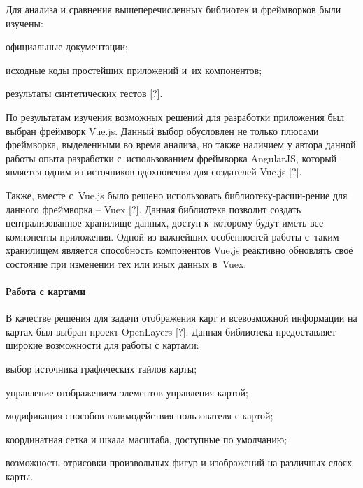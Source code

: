 Для анализа и сравнения вышеперечисленных библиотек и фреймворков были изучены:
\begin{dashitemize}
  \item официальные документации;
  \item исходные коды простейших приложений и~их компонентов;
  \item результаты синтетических тестов [?].
\end{dashitemize}

По результатам изучения возможных решений для разработки приложения был выбран фреймворк Vue.js. Данный выбор обусловлен не только плюсами фреймворка, выделенными во время анализа, но также наличием у автора данной работы опыта разработки с~использованием фреймворка AngularJS, который является одним из источников вдохновения для создателей Vue.js [?].

Также, вместе с~Vue.js было решено использовать библиотеку-расши-рение для данного фреймворка -- Vuex [?]. Данная библиотека позволит создать централизованное хранилище данных, доступ к~которому будут иметь все компоненты приложения. Одной из важнейших особенностей работы с~таким хранилищем является способность компонентов Vue.js реактивно обновлять своё состояние при изменении тех или иных данных в~Vuex.


\paragraph{Работа с картами}

В качестве решения для задачи отображения карт и всевозможной информации на картах был выбран проект OpenLayers [?]. Данная библиотека предоставляет широкие возможности для работы с картами:
\begin{dashitemize}
  \item выбор источника графических тайлов карты;
  \item управление отображением элементов управления картой;
  \item модификация способов взаимодействия пользователя с картой;
  \item координатная сетка и шкала масштаба, доступные по умолчанию;
  \item возможность отрисовки произвольных фигур и изображений на различных слоях карты.
\end{dashitemize}

